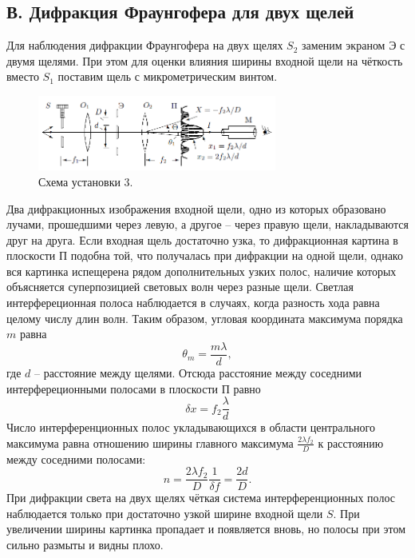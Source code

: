 \documentclass[a4paper,12pt]{article}
\begin{document}
\subsection*{В. Дифракция Фраунгофера для двух щелей}
Для наблюдения дифракции Фраунгофера на двух щелях $S_2$ заменим экраном Э с двумя щелями. При этом для оценки влияния ширины входной щели на чёткость вместо $S_1$ поставим щель с микрометрическим винтом.
\begin{figure}[h]
\includegraphics[width = 0.7\textwidth]{4.png}
\centering
\caption{Схема установки 3.}
\end{figure}
Два дифракционных изображения входной щели, одно из которых образовано лучами, прошедшими через левую, а другое -- через правую щели, накладываются друг на друга.
Если входная щель достаточно узка, то дифракционная картина в плоскости П подобна той, что получалась при дифракции на одной щели, однако вся картинка испещерена рядом дополнительных узких полос, наличие которых объясняется суперпозицией световых волн через разные щели. Светлая интерфереционная полоса наблюдается в случаях, когда разность хода равна целому числу длин волн. Таким образом, угловая координата максимума порядка $m$ равна
\begin{equation}
\theta_m = \dfrac{m \lambda}{d},
\end{equation}
где $d$ -- расстояние между щелями. Отсюда расстояние между соседними интерфереционными полосами в плоскости П равно
\begin{equation}
\delta x = f_2 \dfrac{\lambda}{d}
\end{equation}
Число интерференционных полос укладывающихся в области центрального максимума равна отношению ширины главного максимума $\frac{2\lambda f_2}{D}$ к расстоянию между соседними полосами:
\begin{equation}
n = \dfrac{2\lambda f_2}{D} \dfrac{1}{\delta f}= \dfrac{2d}{D}.
\end{equation}
При дифракции света на двух щелях чёткая система интерференционных полос наблюдается только при достаточно узкой ширине входной щели $S$. При увеличении ширины картинка пропадает и появляется вновь, но полосы при этом сильно размыты и видны плохо.
\end{document}
